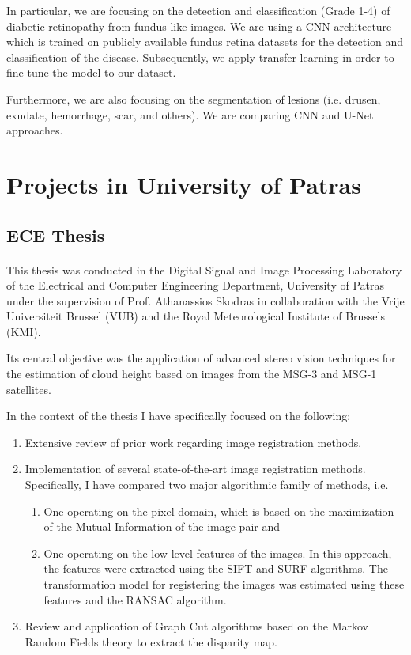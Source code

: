 \documentclass{article}
\begin{document}
In particular, we are focusing on the detection and classification (Grade 1-4) of diabetic retinopathy from fundus-like images. We are using a CNN architecture which is trained on publicly available fundus retina datasets for the detection and classification of the disease. Subsequently, we apply transfer learning in order to fine-tune the model to our dataset.

Furthermore, we are also focusing on the segmentation of lesions (i.e. drusen, exudate, hemorrhage, scar, and others). We are comparing CNN and U-Net approaches.


\section{Projects in University of Patras}

\subsection{ECE Thesis}
\paragraph{}
This thesis was conducted in the Digital Signal and Image Processing Laboratory of the Electrical and Computer Engineering Department, University of Patras under the supervision of Prof. Athanassios Skodras in collaboration with the Vrije Universiteit Brussel (VUB) and the Royal Meteorological Institute of Brussels (KMI). \vspace{4pt}

Its central objective was the application of advanced stereo vision techniques for the estimation of cloud height based on images from the MSG-3 and MSG-1 satellites. \vspace{4pt}

In the context of the thesis I have specifically focused on the following:
\begin{enumerate}
    \item Extensive review of prior work regarding image registration methods.
    \item Implementation of several state-of-the-art image registration methods. Specifically, I have compared two major algorithmic family of methods, i.e.
    \begin{enumerate}
        \item One operating on the pixel domain, which is based on the maximization of the Mutual Information of the image pair and
        \item One operating on the low-level features of the images. In this approach, the features were extracted using the SIFT and SURF algorithms. The transformation model for registering the images was estimated using these features and the RANSAC algorithm.
    \end{enumerate}
    \item  Review and application of Graph Cut algorithms based on the Markov Random Fields theory to extract the disparity map.
\end{enumerate}
\end{document}
